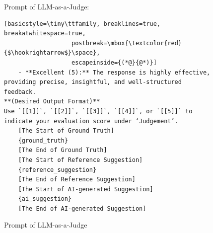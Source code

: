 \documentclass[11pt]{article}
\begin{document}
\begin{figure}[ht]
\begin{AIBox}{Prompt of LLM-as-a-Judge:}
\begin{minipage}[t]{\textwidth}
\begin{lstlisting}[basicstyle=\tiny\ttfamily, breaklines=true, breakatwhitespace=true,
                   postbreak=\mbox{\textcolor{red}{$\hookrightarrow$}\space},
                   escapeinside={(*@}{@*)}]
    - **Excellent (5):** The response is highly effective, providing precise, insightful, and well-structured feedback.
**(Desired Output Format)**
Use `[[1]]`, `[[2]]`, `[[3]]`, `[[4]]`, or `[[5]]` to indicate your evaluation score under ‘Judgement’.
    [The Start of Ground Truth]
    {ground_truth}
    [The End of Ground Truth]
    [The Start of Reference Suggestion]
    {reference_suggestion}
    [The End of Reference Suggestion]
    [The Start of AI-generated Suggestion]
    {ai_suggestion}
    [The End of AI-generated Suggestion]
\end{lstlisting}
\end{minipage}

\end{AIBox}
\caption{Prompt of LLM-as-a-Judge}
\label{fig:llm_as_a_judge_prompt}
\end{figure}
\end{document}
